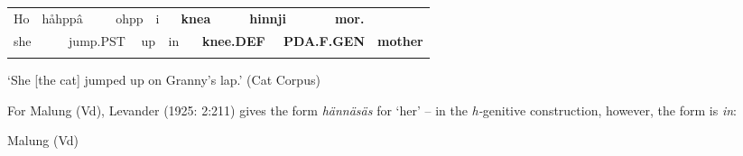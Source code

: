 \begin{tabular}{llllllllllllll}
\lsptoprule
Ho & \multicolumn{2}{l}{håhppâ

} & \multicolumn{2}{l}{ohpp

} & \multicolumn{2}{l}{i

} & \multicolumn{2}{l}{{\bfseries knea}

} & \multicolumn{2}{l}{{\bfseries hinnji}

} & \multicolumn{2}{l}{{\bfseries mor.}

} & \\
\multicolumn{2}{l}{she

} & \multicolumn{2}{l}{jump.PST

} & \multicolumn{2}{l}{up

} & \multicolumn{2}{l}{in

} & \multicolumn{2}{l}{{\bfseries knee.DEF}

} & \multicolumn{2}{l}{{\bfseries PDA.F.GEN}

} & \multicolumn{2}{l}{{\bfseries mother}

}\\
\lspbottomrule
\end{tabular}

\begin{styleTranslation}
‘She [the cat] jumped up on Granny’s lap.’ (Cat Corpus)

\end{styleTranslation}

For Malung (Vd), Levander (1925: 2:211) gives the form \textit{hännäsäs} for ‘her’ – in the \textit{h-}genitive construction, however, the form is \textit{in}: 


\begin{listWWNumileveli}
\item 

\begin{styleExample}
Malung (Vd)

\end{styleExample}

\end{listWWNumileveli}

